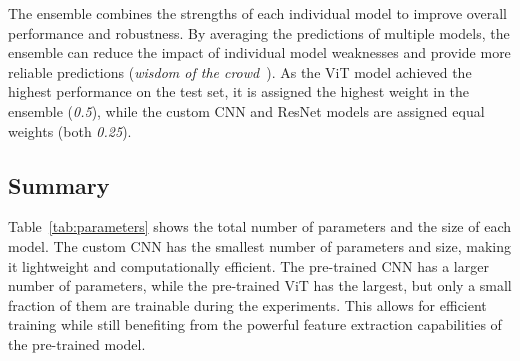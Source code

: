 The ensemble combines the strengths of each individual model to improve overall performance and robustness. By averaging the predictions of multiple models, the ensemble can reduce the impact of individual model weaknesses and provide more reliable predictions (\textit{wisdom of the crowd}~\cite[Chapter~7]{geronoctober2022hands}). As the ViT model achieved the highest performance on the test set, it is assigned the highest weight in the ensemble (\textit{0.5}), while the custom CNN and ResNet models are assigned equal weights (both \textit{0.25}).

\subsection{Summary}

\begin{table}[htbp]
    \caption{Model parameters and size of the custom CNN, pre-trained CNN and pre-trained ViT.}
    \begin{center}
    \end{center}
\end{table}

Table~\ref{tab:parameters} shows the total number of parameters and the size of each model. The custom CNN has the smallest number of parameters and size, making it lightweight and computationally efficient. The pre-trained CNN has a larger number of parameters, while the pre-trained ViT has the largest, but only a small fraction of them are trainable during the experiments. This allows for efficient training while still benefiting from the powerful feature extraction capabilities of the pre-trained model.
